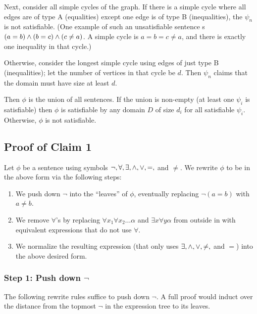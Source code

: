 \documentclass{article}
\begin{document}
Next, consider all simple cycles of the graph. If there is a simple cycle where
all edges are of type A (equalities) except one edge is of type B
(inequalities), the $\psi_n$ is not satisfiable. (One example of such an
unsatisfiable sentence s $(a = b) \wedge (b = c) \wedge (c \neq a)$. A simple cycle
is $a = b = c \neq a$, and there is exactly one inequality in that cycle.)

Otherwise, consider the longest simple cycle using edges of just type B
(inequalities); let the number of vertices in that cycle be $d$. Then $\psi_n$
claims that the domain must have size at least $d$.

Then $\phi$ is the union of all sentences. If the union is non-empty (at least
one $\psi_i$ is satisfiable) then $\phi$ is satisfiable by any domain $D$ of
size $d_i$ for all satisfiable $\psi_i$. Otherwise, $\phi$ is not satisfiable.

\bigskip

\subsection{Proof of Claim 1}

\smallskip

Let $\phi$ be a sentence using symbols $\neg, \forall, \exists, \wedge, \vee, =,$
and $\neq$. We rewrite $\phi$ to be in the above form via the following steps:

\begin{enumerate}[label = {\arabic*)}, itemsep=0mm]
    \item We push down $\neg$ into the ``leaves'' of $\phi$, eventually
        replacing $\neg(a = b)$ with $a \neq b$.
    \item We remove $\forall$'s by replacing $\forall x_1 \forall x_2 \ldots
        \alpha$ and $\exists x \forall y \alpha$ from outside in with
        equivalent expressions that do not use $\forall$.
    \item We normalize the resulting expression (that only uses $\exists, \wedge,
        \vee, \neq,$ and  $=$) into the above desired form.
\end{enumerate}

\subsubsection{Step 1: Push down $\neg$}

The following rewrite rules suffice to push down $\neg$. A full proof would
induct over the distance from the topmost $\neg$ in the expression tree to its
leaves.
\end{document}
